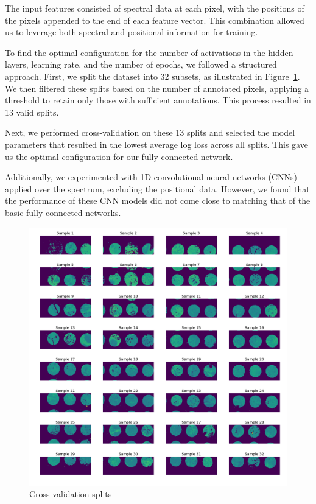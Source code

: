 \documentclass[9pt]{IEEEtran}
\begin{document}
The input features consisted of spectral data at each pixel, with the positions of the pixels appended to the end of each feature vector. This combination allowed us to leverage both spectral and positional information for training.

To find the optimal configuration for the number of activations in the hidden layers, learning rate, and the number of epochs, we followed a structured approach. First, we split the dataset into 32 subsets, as illustrated in Figure~\ref{fig:samples}. We then filtered these splits based on the number of annotated pixels, applying a threshold to retain only those with sufficient annotations. This process resulted in 13 valid splits.

Next, we performed cross-validation on these 13 splits and selected the model parameters that resulted in the lowest average log loss across all splits. This gave us the optimal configuration for our fully connected network.

Additionally, we experimented with 1D convolutional neural networks (CNNs) applied over the spectrum, excluding the positional data. However, we found that the performance of these CNN models did not come close to matching that of the basic fully connected networks.

\begin{figure}[h]
    \centering
    \includegraphics[width=1\columnwidth]{figures/samples.png}
    \caption{Cross validation splits}
    \label{fig:samples}
\end{figure}



\end{document}
